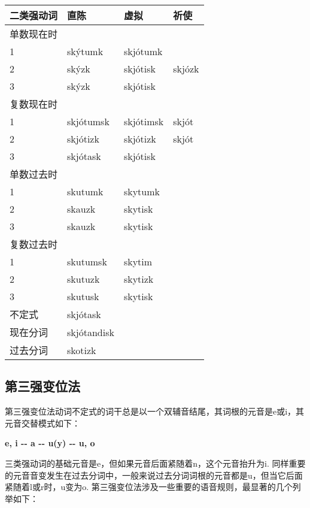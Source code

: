 \begin{longtable}{llll}
  \toprule
  二类强动词 & 直陈          & 虚拟        & 祈使     \\
  \midrule
  \endhead
  \bottomrule
  \endfoot
  单数现在时 &             &           &        \\
  1     & skýtumk     & skjótumk  &        \\
  2     & skýzk       & skjótisk  & skjózk \\
  3     & skýzk       & skjótisk  &        \\
  复数现在时 &             &           &        \\
  1     & skjótumsk   & skjótimsk & skjót  \\
  2     & skjótizk    & skjótizk  & skjót  \\
  3     & skjótask    & skjótisk  &        \\
  单数过去时 &             &           &        \\
  1     & skutumk     & skytumk   &        \\
  2     & skauzk      & skytisk   &        \\
  3     & skauzk      & skytisk   &        \\
  复数过去时 &             &           &        \\
  1     & skutumsk    & skytim    &        \\
  2     & skutuzk     & skytizk   &        \\
  3     & skutusk     & skytisk   &        \\
  不定式   & skjótask    &           &        \\
  现在分词  & skjótandisk &           &        \\
  过去分词  & skotizk     &           &        \\
\end{longtable}

\subsection{第三强变位法}\label{第三强变位法}

第三强变位法动词不定式的词干总是以一个双辅音结尾，其词根的元音是e或i，其元音交替模式如下：

\textbf{e, i -\/- a -\/- u(y) -\/- u, o}

三类强动词的基础元音是e，但如果元音后面紧随着n，这个元音抬升为i.
同样重要的元音音变发生在过去分词中，一般来说过去分词词根的元音都是u，但当它后面紧随着l或r时，u变为o.
第三强变位法涉及一些重要的语音规则，最显著的几个列举如下：

